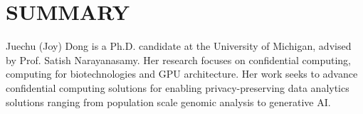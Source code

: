\section{SUMMARY}
Juechu (Joy) Dong is a Ph.D. candidate at the University of Michigan, advised by Prof. Satish Narayanasamy. 
Her research focuses on confidential computing, computing for biotechnologies and GPU architecture. Her work seeks to advance confidential computing solutions for enabling privacy-preserving data analytics solutions ranging from population scale genomic analysis to generative AI. 
